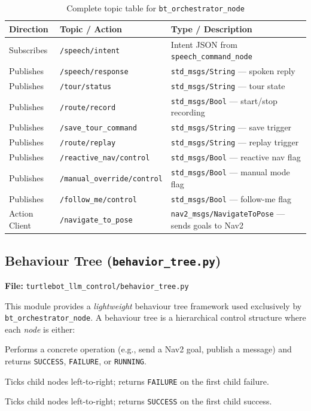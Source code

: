 \documentclass[12pt,a4paper]{report}
\newcommand{\topic}[1]{\texttt{\color{purple!80!black}#1}}
\newcommand{\file}[1]{\texttt{\color{black!70}#1}}
\newcommand{\node}[1]{\texttt{\color{Maroon}#1}}
\begin{document}
\begin{table}[H]
  \centering
  \caption{Complete topic table for \texttt{bt\_orchestrator\_node}}
  \begin{tabularx}{\linewidth}{L{3cm} L{5.5cm} X}
    \toprule
    \textbf{Direction} & \textbf{Topic / Action} & \textbf{Type / Description} \\
    \midrule
    Subscribes  & \topic{/speech/intent}           & Intent JSON from \node{speech\_command\_node} \\
    \midrule
    Publishes   & \topic{/speech/response}         & \texttt{std\_msgs/String} — spoken reply \\
    Publishes   & \topic{/tour/status}             & \texttt{std\_msgs/String} — tour state \\
    Publishes   & \topic{/route/record}            & \texttt{std\_msgs/Bool} — start/stop recording \\
    Publishes   & \topic{/save\_tour\_command}     & \texttt{std\_msgs/String} — save trigger \\
    Publishes   & \topic{/route/replay}            & \texttt{std\_msgs/String} — replay trigger \\
    Publishes   & \topic{/reactive\_nav/control}   & \texttt{std\_msgs/Bool} — reactive nav flag \\
    Publishes   & \topic{/manual\_override/control}& \texttt{std\_msgs/Bool} — manual mode flag \\
    Publishes   & \topic{/follow\_me/control}      & \texttt{std\_msgs/Bool} — follow-me flag \\
    \midrule
    Action Client & \topic{/navigate\_to\_pose}    & \texttt{nav2\_msgs/NavigateToPose} — sends goals to Nav2 \\
    \bottomrule
  \end{tabularx}
\end{table}

\subsection{Behaviour Tree (\texttt{behavior\_tree.py})}

\textbf{File:} \file{turtlebot\_llm\_control/behavior\_tree.py}

This module provides a \emph{lightweight} behaviour tree framework used
exclusively by \node{bt\_orchestrator\_node}.  A behaviour tree is a
hierarchical control structure where each \emph{node} is either:

\begin{description}[leftmargin=2em]
  \item[Leaf node (Action)] Performs a concrete operation (e.g., send a Nav2
    goal, publish a message) and returns \texttt{SUCCESS}, \texttt{FAILURE},
    or \texttt{RUNNING}.
  \item[Sequence node] Ticks child nodes left-to-right; returns \texttt{FAILURE}
    on the first child failure.
  \item[Selector/Fallback node] Ticks child nodes left-to-right; returns
    \texttt{SUCCESS} on the first child success.
\end{description}
\end{document}
